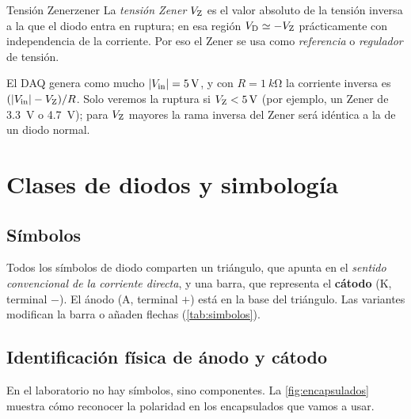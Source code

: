 \documentclass[11pt,a4paper]{article}
\begin{document}
\begin{definicion}{Tensión Zener}{zener}
  La \emph{tensión Zener} $V_{\mathrm Z}$ es el valor absoluto de la tensión inversa a
  la que el diodo entra en ruptura; en esa región $V_{\mathrm D}\simeq-V_{\mathrm Z}$
  prácticamente con independencia de la corriente. Por eso el Zener se usa
  como \emph{referencia} o \emph{regulador} de tensión.
\end{definicion}

\begin{observacion}
  El DAQ genera como mucho $|V_{\mathrm{in}}|=\SI{5}{V}$, y con $R=\SI{1}{k\ohm}$ la
  corriente inversa es $(|V_{\mathrm{in}}|-V_{\mathrm Z})/R$. Solo veremos la ruptura si
  $V_{\mathrm Z}<\SI{5}{V}$ (por ejemplo, un Zener de \SI{3.3}{V} o \SI{4.7}{V}); para
  $V_{\mathrm Z}$ mayores la rama inversa del Zener será idéntica a la de un diodo
  normal.
\end{observacion}

\section{Clases de diodos y simbología}
\label{sec:simbologia}

\subsection{Símbolos}

Todos los símbolos de diodo comparten un triángulo, que apunta en el
\emph{sentido convencional de la corriente directa}, y una barra, que
representa el \textbf{cátodo} (K, terminal $-$). El ánodo (A, terminal $+$)
está en la base del triángulo. Las variantes modifican la barra o añaden
flechas (\cref{tab:simbolos}).

\begin{table}[htbp]
  \centering\small
  \caption{Símbolos normalizados de los diodos más comunes. En todos, la
  corriente directa entra por el ánodo A y sale por el cátodo K. En esta
  práctica se usan los tres primeros.}
  \label{tab:simbolos}
  
\end{table}

\subsection{Identificación física de ánodo y cátodo}

En el laboratorio no hay símbolos, sino componentes. La
\cref{fig:encapsulados} muestra cómo reconocer la polaridad en los
encapsulados que vamos a usar.
\end{document}
